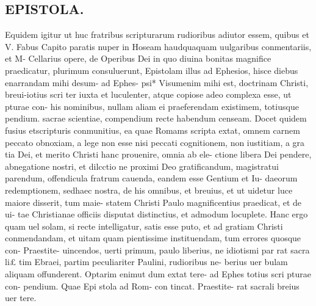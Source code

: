 \documentclass{article}
\begin{document}
\begin{pages}
\section*{EPISTOLA. }\pstart Equidem igitur ut huc fratribus scripturarum rudioribus   adiutor essem, quibus et V. Fabus  Capito paratis nuper in Hoseam haudquaquam uulgaribus conmentariis, et M- Cellarius opere, de Operibus Dei in quo diuina bonitas magnifice praedicatur, plurimum consuluerunt, Epistolam illus ad Ephesios, hisce diebus enarrandam mihi desum- ad Ephes- psi* Visumenim mihi est, doctrinam Christi, breui-iotius scri ter iuxta et luculenter, atque copiose adeo complexa esse, ut pturae con- his nominibus, nullam aliam ei praeferendam existimem, totiusque pendium. sacrae scientiae, compendium recte habendum censeam.  \pend\pstart Docet quidem fusius etscripturis conmunitius, ea quae Romams scripta extat, omnem carnem peccato obnoxiam, a lege non esse nisi peccati cognitionem, non iustitiam, a gra tia Dei, et merito Christi hanc prouenire, omnia ab ele- ctione libera Dei pendere, abnegatione nostri, et dilcctio ne proximi Deo gratificandum, magistratui parendum, offendicula fratrum cauenda, eandem esse Gentium et Iu- daeorum redemptionem, sedhaec nostra, de his omnibus, et breuius, et ut uidetur luce maiore disserit, tum maie- statem Christi Paulo magnificentius praedicat, et de ui- tae Christianae officiis disputat distinctius, et admodum locuplete.  \pend\pstart Hanc ergo quam uel solam, si recte intelligatur, satis esse puto, et ad gratiam Christi conmendandam, et uitam quam pientissime instituendam, tum errores quosque con- Praestite- uincendos, uerti primum, paulo liberius, ne idiotismi par rat sacra li£ tim Ebraei, partim peculiariter Paulini, rudioribus ne- berius uer bulam aliquam offunderent. Optarim enimut dum extat tere-  \pendEpistola ad Ephes totius scri pturae con- pendium.  Quae Epi stola ad Rom- con tincat. Praestite- rat sacrali breius uer tere.  

\end{pages}
\end{document}
